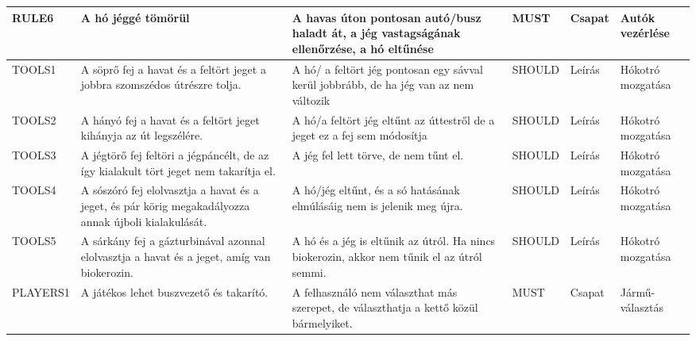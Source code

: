 \begin{longtable}{| p{2cm} | p{4cm} | p{2.7cm} | p{2cm} | p{1.5cm} | p{2.0cm}|}
    RULE6 & %
    A hó jéggé tömörül & %
    A havas úton pontosan autó/busz haladt át, a jég vastagságának ellenőrzése, a hó eltűnése & %
    MUST & %
    Csapat & %
    Autók vezérlése \\ %
    \hline

	
    TOOLS1 & %
    A söprő fej a havat és a feltört jeget a jobbra szomszédos útrészre tolja.& %
    A hó/ a feltört jég pontosan egy sávval kerül jobbrább, de ha jég van az nem változik & %
    SHOULD & %
    Leírás & %
    Hókotró mozgatása \\ %
    \hline
	
    TOOLS2 & %
    A hányó fej a havat és a feltört jeget kihányja az út legszélére.& %
    A hó/a feltört jég eltűnt az úttestről de a jeget ez a fej sem módosítja  & %
    SHOULD & %
    Leírás & %
    Hókotró mozgatása \\ %
    \hline
	
    TOOLS3 & %
    A jégtörő fej feltöri a jégpáncélt, de az így kialakult tört jeget nem takarítja el. & %
    A jég fel lett törve, de nem tűnt el. & %
    SHOULD & %
    Leírás & %
    Hókotró mozgatása \\ %
    \hline

    TOOLS4 & %
    A sószóró fej elolvasztja a havat és a jeget, és pár körig megakadályozza annak újboli kialakulását.& %
    A hó/jég eltűnt, és a só hatásának elmúlásáig nem is jelenik meg újra. & %
    SHOULD & %
    Leírás & %
    Hókotró mozgatása \\ %
    \hline

    TOOLS5 & %
    A sárkány fej a gázturbinával azonnal elolvasztja a havat és a jeget, amíg van biokerozin. & %
    A hó és a jég is eltűnik az útról. Ha nincs biokerozin, akkor nem tűnik el az útról semmi. & %
    SHOULD & %
    Leírás & %
    Hókotró mozgatása \\ %
    \hline

    PLAYERS1 & %
    A játékos lehet buszvezető és takarító.  & %
    A felhasználó nem választhat más szerepet, de választhatja a kettő közül bármelyiket.  & %
    MUST & %
    Csapat & %
    Jármű-
    választás \\ %
    \hline


\end{longtable}
